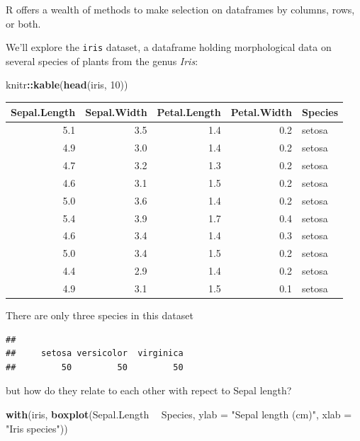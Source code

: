 \documentclass[]{book}
\newenvironment{Shaded}{\begin{snugshade}}{\end{snugshade}}
\newcommand{\DataTypeTok}[1]{\textcolor[rgb]{0.13,0.29,0.53}{#1}}
\newcommand{\DecValTok}[1]{\textcolor[rgb]{0.00,0.00,0.81}{#1}}
\newcommand{\KeywordTok}[1]{\textcolor[rgb]{0.13,0.29,0.53}{\textbf{#1}}}
\newcommand{\NormalTok}[1]{#1}
\newcommand{\OperatorTok}[1]{\textcolor[rgb]{0.81,0.36,0.00}{\textbf{#1}}}
\newcommand{\StringTok}[1]{\textcolor[rgb]{0.31,0.60,0.02}{#1}}
\begin{document}
R offers a wealth of methods to make selection on dataframes by columns, rows, or both.

We'll explore the \texttt{iris} dataset, a dataframe holding morphological data on several species of plants from the genus \emph{Iris}:

\begin{Shaded}
\begin{Highlighting}[]
\NormalTok{knitr}\OperatorTok{::}\KeywordTok{kable}\NormalTok{(}\KeywordTok{head}\NormalTok{(iris, }\DecValTok{10}\NormalTok{))}
\end{Highlighting}
\end{Shaded}

\begin{tabular}{r|r|r|r|l}
\hline
Sepal.Length & Sepal.Width & Petal.Length & Petal.Width & Species\\
\hline
5.1 & 3.5 & 1.4 & 0.2 & setosa\\
\hline
4.9 & 3.0 & 1.4 & 0.2 & setosa\\
\hline
4.7 & 3.2 & 1.3 & 0.2 & setosa\\
\hline
4.6 & 3.1 & 1.5 & 0.2 & setosa\\
\hline
5.0 & 3.6 & 1.4 & 0.2 & setosa\\
\hline
5.4 & 3.9 & 1.7 & 0.4 & setosa\\
\hline
4.6 & 3.4 & 1.4 & 0.3 & setosa\\
\hline
5.0 & 3.4 & 1.5 & 0.2 & setosa\\
\hline
4.4 & 2.9 & 1.4 & 0.2 & setosa\\
\hline
4.9 & 3.1 & 1.5 & 0.1 & setosa\\
\hline
\end{tabular}

There are only three species in this dataset

\begin{Shaded}
\end{Shaded}

\begin{verbatim}
## 
##     setosa versicolor  virginica 
##         50         50         50
\end{verbatim}

but how do they relate to each other with repect to Sepal length?

\begin{Shaded}
\begin{Highlighting}[]
\KeywordTok{with}\NormalTok{(iris, }\KeywordTok{boxplot}\NormalTok{(Sepal.Length }\OperatorTok{~}\StringTok{ }\NormalTok{Species,}
                   \DataTypeTok{ylab =} \StringTok{"Sepal length (cm)"}\NormalTok{,}
                   \DataTypeTok{xlab =} \StringTok{"Iris species"}\NormalTok{))}
\end{Highlighting}
\end{Shaded}
\end{document}
